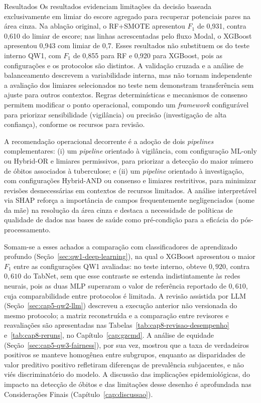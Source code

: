 \begin{chapter}{Resultados}
Os resultados evidenciam limitações da decisão baseada exclusivamente em limiar do escore agregado para recuperar potenciais pares na área cinza. Na ablação original, o RF+SMOTE apresentou $F_1$ de 0,931, contra 0,610 do limiar de escore; nas linhas acrescentadas pelo fluxo Modal, o XGBoost apresentou 0,943 com limiar de 0,7. Esses resultados não substituem os do teste interno QW1, com $F_1$ de 0,855 para RF e 0,920 para XGBoost, pois as configurações e os protocolos são distintos. A validação cruzada e a análise de balanceamento descrevem a variabilidade interna, mas não tornam independente a avaliação dos limiares selecionados no teste nem demonstram transferência sem ajuste para outros contextos. Regras determinísticas e mecanismos de consenso permitem modificar o ponto operacional, compondo um \textit{framework} configurável para priorizar sensibilidade (vigilância) ou precisão (investigação de alta confiança), conforme os recursos para revisão.

A recomendação operacional decorrente é a adoção de dois \textit{pipelines} complementares: (i) um \textit{pipeline} orientado à vigilância, com configuração ML-only ou Hybrid-OR e limiares permissivos, para priorizar a detecção do maior número de óbitos associados à tuberculose; e (ii) um \textit{pipeline} orientado à investigação, com configurações Hybrid-AND ou consenso e limiares restritivos, para minimizar revisões desnecessárias em contextos de recursos limitados. A análise interpretável via SHAP reforça a importância de campos frequentemente negligenciados (nome da mãe) na resolução da área cinza e destaca a necessidade de políticas de qualidade de dados nas bases de saúde como pré-condição para a eficácia do pós-processamento.

Somam-se a esses achados a comparação com classificadores de aprendizado profundo (Seção~\ref{sec:qw1-deep-learning}), na qual o XGBoost apresentou o maior $F_1$ entre as configurações QW1 avaliadas: no teste interno, obteve $0{,}920$, contra $0{,}610$ do TabNet, sem que esse contraste se estenda indistintamente às redes neurais, pois as duas MLP superaram o valor de referência reportado de $0{,}610$, cuja comparabilidade entre protocolos é limitada. A revisão assistida por LLM (Seção~\ref{sec:cap5-qw2-llm}) descreveu a execução anterior não versionada do mesmo protocolo; a matriz reconstruída e a comparação entre revisores e reavaliações são apresentadas nas Tabelas~\ref{tab:cap8-revisao-desempenho} e~\ref{tab:cap8-reruns}, no Capítulo~\ref{cap:gzcmd}. A análise de equidade (Seção~\ref{sec:cap5-qw3-fairness}), por sua vez, mostrou que a taxa de verdadeiros positivos se manteve homogênea entre subgrupos, enquanto as disparidades de valor preditivo positivo refletiram diferenças de prevalência subjacentes, e não viés discriminatório do modelo.
A discussão das implicações epidemiológicas, do impacto na detecção de óbitos e das limitações desse desenho é aprofundada nas Considerações Finais (Capítulo~\ref{cap:discussao}).

\end{chapter}
